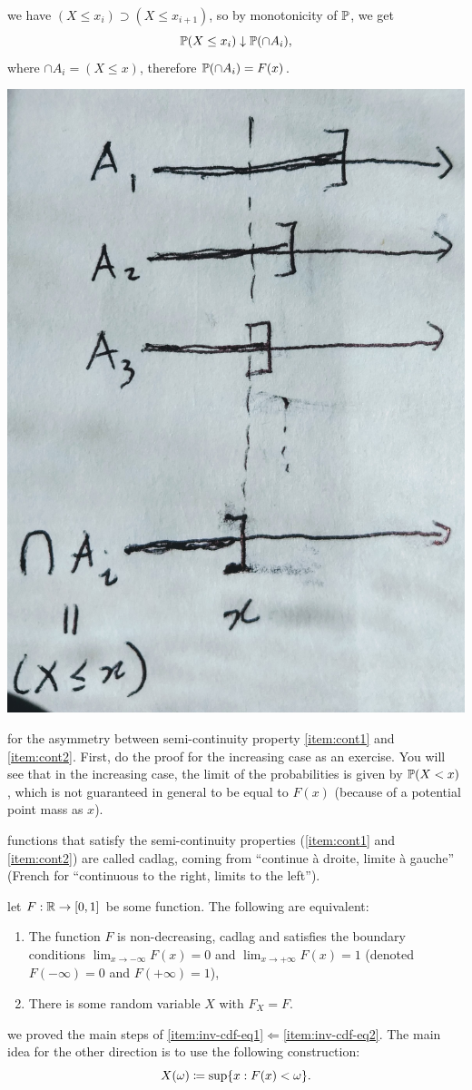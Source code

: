 \documentclass{article}
\begin{document}
 we have $(X \le x_i) \supset (X \le x_{i+1})$, so by monotonicity of $\P$, we get
\[ \P(X \le x_i) \downarrow \P(\cap A_i), \]
where $\cap A_i = (X \le x)$, therefore $\P(\cap A_i) = F(x)$.
\begin{center}
	\includegraphics[width=0.3\linewidth]{figures/limit-cdf}
\end{center}

 for the asymmetry between semi-continuity property \ref{item:cont1} and \ref{item:cont2}. First, do the proof for the increasing case as an exercise. You will see that in the increasing case, the limit of the probabilities is given by $\P(X < x)$, which is not guaranteed in general to be equal to $F(x)$ (because of a potential point mass as $x$).

 functions that satisfy the semi-continuity properties (\ref{item:cont1} and \ref{item:cont2}) are called cadlag, coming from ``continue \`a droite, limite \`a gauche'' (French for ``continuous to the right, limits to the left'').

 let $F : \R \to [0, 1]$ be some function. The following are equivalent:
\begin{enumerate}
  \item \label{item:inv-cdf-eq1} The function $F$ is non-decreasing, cadlag and satisfies the boundary conditions $\lim_{x \to -\infty} F(x) = 0$ and $\lim_{x \to +\infty} F(x) = 1$ (denoted $F(-\infty) = 0$ and $F(+\infty) = 1$),
  \item \label{item:inv-cdf-eq2} There is some random variable $X$ with $F_X = F$.
\end{enumerate}

 we proved the main steps of \ref{item:inv-cdf-eq1}$\Longleftarrow$\ref{item:inv-cdf-eq2}. The main idea for the other direction is to use the following construction:
\[ X(\omega) \defeq \sup\{x : F(x) < \omega\}. \]
\end{document}
